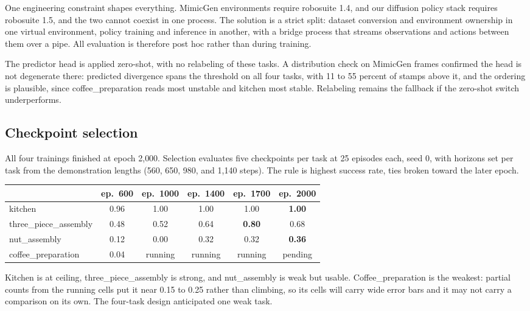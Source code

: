 \documentclass[11pt]{article}
\begin{document}
One engineering constraint shapes everything. MimicGen environments require
robosuite 1.4, and our diffusion policy stack requires robosuite 1.5, and the
two cannot coexist in one process. The solution is a strict split: dataset
conversion and environment ownership in one virtual environment, policy
training and inference in another, with a bridge process that streams
observations and actions between them over a pipe. All evaluation is
therefore post hoc rather than during training.

The predictor head is applied zero-shot, with no relabeling of these tasks. A
distribution check on MimicGen frames confirmed the head is not degenerate
there: predicted divergence spans the threshold on all four tasks, with 11 to
55 percent of stamps above it, and the ordering is plausible, since
coffee\_preparation reads most unstable and kitchen most stable. Relabeling
remains the fallback if the zero-shot switch underperforms.

\subsection{Checkpoint selection}

All four trainings finished at epoch 2{,}000. Selection evaluates five
checkpoints per task at 25 episodes each, seed 0, with horizons set per task
from the demonstration lengths (560, 650, 980, and 1{,}140 steps). The rule
is highest success rate, ties broken toward the later epoch.

\begin{center}
\small
\begin{tabular}{@{}lccccc@{}}
\toprule
 & ep.\ 600 & ep.\ 1000 & ep.\ 1400 & ep.\ 1700 & ep.\ 2000 \\
\midrule
kitchen                & 0.96 & 1.00 & 1.00 & 1.00 & \textbf{1.00} \\
three\_piece\_assembly & 0.48 & 0.52 & 0.64 & \textbf{0.80} & 0.68 \\
nut\_assembly          & 0.12 & 0.00 & 0.32 & 0.32 & \textbf{0.36} \\
coffee\_preparation    & 0.04 & running & running & running & pending \\
\bottomrule
\end{tabular}
\end{center}

Kitchen is at ceiling, three\_piece\_assembly is strong, and nut\_assembly is
weak but usable. Coffee\_preparation is the weakest: partial counts from the
running cells put it near 0.15 to 0.25 rather than climbing, so its cells will
carry wide error bars and it may not carry a comparison on its own. The
four-task design anticipated one weak task.
\end{document}
